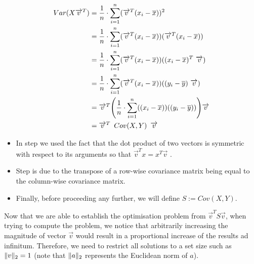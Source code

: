 \vspace{-25mm}
{
\begin{align}
	\label{formula:maxVarI}
	Var(X\overrightarrow{v}^T) &= \frac{1}{n} \cdot \displaystyle\sum_{i=1}^{n} (\overrightarrow{v}^T(x_i-\overline{x}))^2
	\\
	\label{formula:maxVarII}
	&= \frac{1}{n} \cdot \displaystyle\sum_{i=1}^{n} (\overrightarrow{v}^T(x_i-\overline{x})) (\overrightarrow{v}^T(x_i-\overline{x}))
	\\
	\label{formula:maxVarIII}
	&= \frac{1}{n} \cdot \displaystyle\sum_{i=1}^{n} (\overrightarrow{v}^T(x_i-\overline{x})) ((x_i-\overline{x})^T \ \overrightarrow{v})
	\\
	\label{formula:maxVarIV}
	&= \frac{1}{n} \cdot \displaystyle\sum_{i=1}^{n} (\overrightarrow{v}^T(x_i-\overline{x})) ((y_i-\overline{y}) \ \overrightarrow{v})
	\\
	\label{formula:maxVarV}
	&= \overrightarrow{v}^T \Bigg(\frac{1}{n} \cdot \displaystyle\sum_{i=1}^{n} ((x_i-\overline{x})) ((y_i-\overline{y}))\Bigg) \overrightarrow{v}
	\\
	\label{formula:maxVarVI}
	&= \overrightarrow{v}^T \enskip Cov(X,Y) \enskip \overrightarrow{v}
\end{align}
}

\vspace{-16mm}

\begin{itemize}
	\item In step  we used the fact that the dot product of two vectors is symmetric with respect to its arguments so that $\overrightarrow{v}^T x  = x^T\overrightarrow{v}$ \cite{deisenroth2020mathematics}.
	\item Step  is due to the transpose of a row-wise covariance matrix being equal to the column-wise covariance matrix.
	\item Finally, before proceeding any further, we will define $S := Cov(X,Y)$.
\end{itemize}


\clearpage

Now that we are able to establish the optimisation problem from $\overrightarrow{v}^T S \overrightarrow{v}$, when trying to compute the problem, we notice that arbitrarily increasing the magnitude of vector $\overrightarrow{v}$ would result in a proportional increase of the results ad infinitum.
Therefore, we need to restrict all solutions to a set size such as $\lVert v\rVert_2 = 1$ (note that $\lVert a\rVert_2$ represents the Euclidean norm of $a$).

